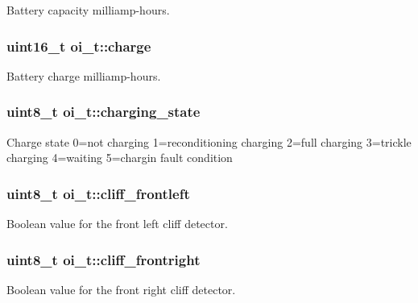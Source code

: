 Battery capacity milliamp-\/hours. 

\hypertarget{structoi__t_af021bc9cdad4bf3a1793d242f314b498}{
\subsubsection[{charge}]{\setlength{\rightskip}{0pt plus 5cm}uint16\_\-t {\bf oi\_\-t::charge}}}
\label{structoi__t_af021bc9cdad4bf3a1793d242f314b498}


Battery charge milliamp-\/hours. 

\hypertarget{structoi__t_ae5f22bf498c302589ab9723a12214990}{
\subsubsection[{charging\_\-state}]{\setlength{\rightskip}{0pt plus 5cm}uint8\_\-t {\bf oi\_\-t::charging\_\-state}}}
\label{structoi__t_ae5f22bf498c302589ab9723a12214990}
Charge state 0=not charging 1=reconditioning charging 2=full charging 3=trickle charging 4=waiting 5=chargin fault condition \hypertarget{structoi__t_ad6189a6c58988a2e6a9bb47651f675dc}{
\subsubsection[{cliff\_\-frontleft}]{\setlength{\rightskip}{0pt plus 5cm}uint8\_\-t {\bf oi\_\-t::cliff\_\-frontleft}}}
\label{structoi__t_ad6189a6c58988a2e6a9bb47651f675dc}


Boolean value for the front left cliff detector. 

\hypertarget{structoi__t_ac47905c2ddb4c9ffc6bdc72b75231c37}{
\subsubsection[{cliff\_\-frontright}]{\setlength{\rightskip}{0pt plus 5cm}uint8\_\-t {\bf oi\_\-t::cliff\_\-frontright}}}
\label{structoi__t_ac47905c2ddb4c9ffc6bdc72b75231c37}


Boolean value for the front right cliff detector. 

